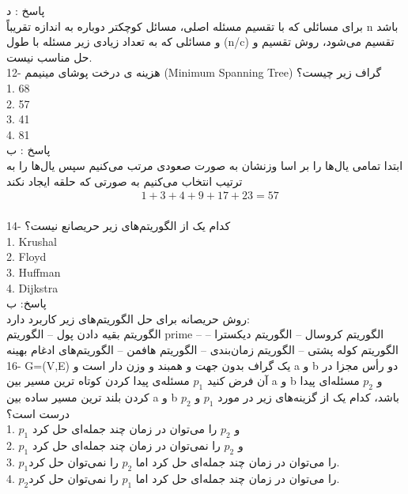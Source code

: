 \documentclass[10pt,a4paper]{article}
\begin{document}
پاسخ : د\\
برای مسائلی که با تقسیم مسئله اصلی، مسائل کوچکتر دوباره به اندازه تقریباً n باشد و مسائلی که به تعداد زیادی زیر مسئله با طول (n/c) تقسیم می‌شود، روش تقسیم و حل مناسب نیست.\\

12- هزینه ی درخت پوشای مینیمم (Minimum Spanning Tree) گراف زیر چیست؟\\

1. 68 \\
2. 57 \\
3. 41 \\
4. 81\\

پاسخ : ب\\
ابتدا تمامی یال‌ها را بر اسا وزنشان به صورت صعودی مرتب می‌کنیم سپس یال‌ها را به ترتیب انتخاب می‌کنیم به صورتی که حلقه ایجاد نکند\\

\begin{align*}
&1+3+4+9+17+23=57\\
\end{align*}

14-  کدام یک از الگوریتم‌های زیر حریصانع نیست؟\\
1. Krushal \\
2. Floyd \\
3. Huffman \\
4. Dijkstra  \\

پاسخ: ب\\
روش حریصانه برای حل الگوریتم‌های زیر کاربرد دارد:\\
الگوریتم بقیه دادن پول -- الگوریتم prime -- الگوریتم کروسال -- الگوریتم دیکسترا -- الگوریتم کوله پشتی -- الگوریتم زمان‌بندی -- الگوریتم هافمن -- الگوریتم‌های ادغام بهینه \\

16- G=(V,E) یک گراف بدون جهت و همبند و وزن دار است و a و b دو رأس مجزا در آن فرض کنید $p_1$ مسئله‌ی پیدا کردن کوتاه ترین مسیر بین a و b و $p_2$ مسئله‌ای پیدا کردن بلند ترین مسیر ساده بین a و b باشد، کدام یک از گزینه‌های زیر در مورد $p_1$ و $p_2$ درست است؟\\
1.  $p_1$ و $p_2$  را می‌توان در زمان چند جمله‌ای حل کرد\\
2. $p_1$ و $p_2$  را نمی‌توان در زمان چند جمله‌ای حل کرد\\
3.  $p_1$را می‌توان در زمان چند جمله‌ای حل کرد اما  $p_2$  را نمی‌توان حل کرد.\\
4.  $p_2$را می‌توان در زمان چند جمله‌ای حل کرد اما  $p_1$  را نمی‌توان حل کرد.\\
\end{document}
